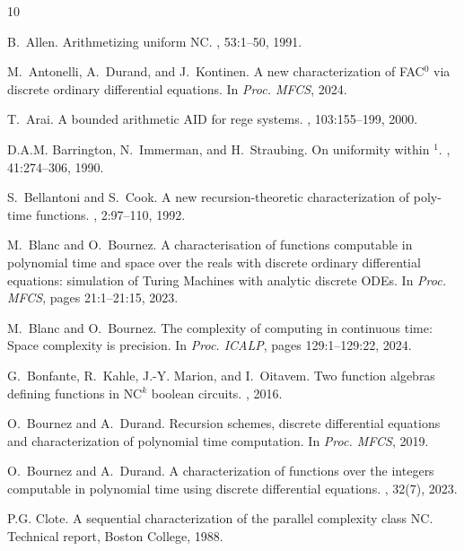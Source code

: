 \documentclass[11pt, oneside]{article}
\theoremstyle{definition}
\begin{document}
\begin{thebibliography}{10}

B.~Allen.
\newblock Arithmetizing uniform {NC}.
, 53:1--50, 1991.

M.~Antonelli, A.~Durand, and J.~Kontinen.
\newblock A new characterization of {FAC}$^0$ via discrete ordinary
  differential equations.
\newblock In {\em Proc. MFCS}, 2024.

T.~Arai.
\newblock A bounded arithmetic {AID} for rege systems.
, 103:155--199, 2000.

D.A.M. Barrington, N.~Immerman, and H.~Straubing.
\newblock On uniformity within $^1$.
, 41:274--306, 1990.

S.~Bellantoni and S.~Cook.
\newblock A new recursion-theoretic characterization of poly-time functions.
, 2:97--110, 1992.

M.~Blanc and O.~Bournez.
\newblock A characterisation of functions computable in polynomial time and
  space over the reals with discrete ordinary differential equations:
  simulation of {T}uring {M}achines with analytic discrete {ODE}s.
\newblock In {\em Proc. MFCS}, pages 21:1--21:15, 2023.

M.~Blanc and O.~Bournez.
\newblock The complexity of computing in continuous time: Space complexity is
  precision.
\newblock In {\em Proc. ICALP}, pages 129:1--129:22, 2024.

G.~Bonfante, R.~Kahle, J.-Y. Marion, and I.~Oitavem.
\newblock Two function algebras defining functions in {NC}$^k$ boolean
  circuits.
, 2016.

O.~Bournez and A.~Durand.
\newblock Recursion schemes, discrete differential equations and
  characterization of polynomial time computation.
\newblock In {\em Proc. MFCS}, 2019.

O.~Bournez and A.~Durand.
\newblock A characterization of functions over the integers computable in
  polynomial time using discrete differential equations.
, 32(7), 2023.

P.G. Clote.
\newblock A sequential characterization of the parallel complexity class {NC}.
\newblock Technical report, Boston College, 1988.


\end{thebibliography}
\end{document}
